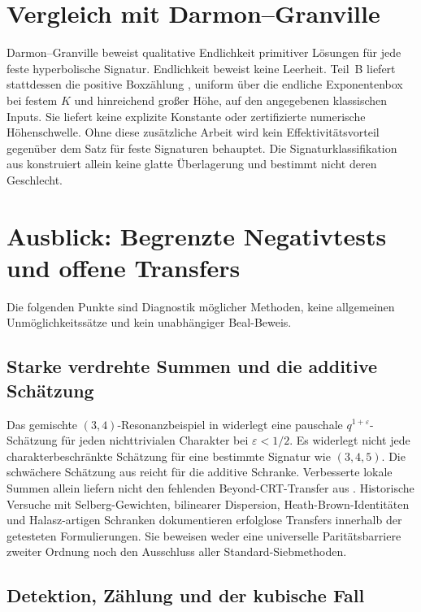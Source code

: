 \documentclass[11pt,a4paper]{article}
\begin{document}
\section{Vergleich mit Darmon--Granville}

Darmon--Granville \cite{DarmonGranville1995} beweist qualitative
Endlichkeit primitiver Lösungen für jede feste hyperbolische
Signatur. Endlichkeit beweist keine Leerheit.
Teil~B liefert stattdessen die positive Boxzählung
, uniform über die endliche Exponentenbox bei festem
$K$ und hinreichend großer Höhe, auf den angegebenen klassischen
Inputs. Sie liefert keine explizite Konstante oder zertifizierte
numerische Höhenschwelle. Ohne diese zusätzliche Arbeit wird kein
Effektivitätsvorteil gegenüber dem Satz für feste Signaturen behauptet.
Die Signaturklassifikation aus  konstruiert
allein keine glatte Überlagerung und bestimmt nicht deren Geschlecht.

\section{Ausblick: Begrenzte Negativtests und offene Transfers}
\label{sec:outlook}

Die folgenden Punkte sind Diagnostik möglicher Methoden, keine
allgemeinen Unmöglichkeitssätze und kein unabhängiger Beal-Beweis.

\subsection{Starke verdrehte Summen und die additive Schätzung}
\label{sec:outlook-elim1}

Das gemischte $(3,4)$-Resonanzbeispiel in
 widerlegt eine pauschale
$q^{1+\varepsilon}$-Schätzung für jeden nichttrivialen Charakter
bei $\varepsilon<1/2$. Es widerlegt nicht jede charakterbeschränkte
Schätzung für eine bestimmte Signatur wie $(3,4,5)$.
Die schwächere Schätzung aus  reicht für die additive
Schranke. Verbesserte lokale Summen allein liefern nicht den
fehlenden Beyond-CRT-Transfer aus .
Historische Versuche mit Selberg-Gewichten, bilinearer Dispersion,
Heath-Brown-Identitäten und Halasz-artigen Schranken
\cite{BFI1986,HB1982,HalaszPretentious} dokumentieren erfolglose
Transfers innerhalb der getesteten Formulierungen. Sie beweisen
weder eine universelle Paritätsbarriere zweiter Ordnung noch den
Ausschluss aller Standard-Siebmethoden.

\subsection{Detektion, Zählung und der kubische Fall}
\label{sec:outlook-elim2}
\end{document}
